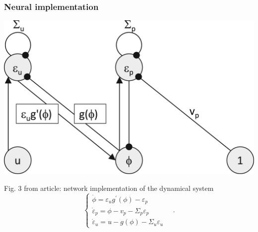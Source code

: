 \documentclass[aspectratio=169]{beamer}
\begin{document}
\begin{frame}
  \frametitle{Neural implementation}
  \begin{center}
    \includegraphics[width=0.5\textheight]{Fig3}
  \end{center}
  Fig. 3 from article: network implementation of the dynamical system
  \begin{equation}
    \label{eq:dynamical_system_single}
    \begin{cases}
      \dot{\phi} = \varepsilon_u g^\prime(\phi) - \varepsilon_p \\
      \dot{\varepsilon}_p = \phi - v_p - \Sigma_p \varepsilon_p \\
      \dot{\varepsilon}_u = u - g(\phi) - \Sigma_u \varepsilon_u
    \end{cases}
    \quad .
  \end{equation}
\end{frame}
\end{document}
